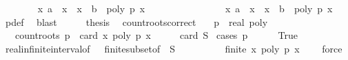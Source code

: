 \begin{isabellebody}
\ \ \ \ \ \ \isamarkupfalse%
\ {\isachardoublequoteopen}{\isacharbraceleft}x{\isachardot}\ a\ {\isacharless}\ x\ {\isasymand}\ x\ {\isasymle}\ b\ {\isasymand}\ poly\ p{\isacharprime}\ x\ {\isacharequal}\ {}{\isacharbraceright}\ {\isacharequal}\ \isanewline
\ \ \ \ \ \ \ \ \ \ \ \ {\isacharbraceleft}x{\isachardot}\ a\ {\isacharless}\ x\ {\isasymand}\ x\ {\isasymle}\ b\ {\isasymand}\ poly\ p\ x\ {\isacharequal}\ {}{\isacharbraceright}{\isachardoublequoteclose}\ \isamarkupfalse%
\ p{\isacharprime}{\isacharunderscore}def\ \isamarkupfalse%
\ blast\isanewline
\ \ \isamarkupfalse%
\ \isamarkupfalse%
\ {\isacharquery}thesis\ \isacommand{{\isachardot}}\isamarkupfalse%
\isanewline
{}\isamarkupfalse%
%
\endisatagproof
{\isafoldproof}%
%
\isadelimproof
\isanewline
%
\endisadelimproof
\isanewline
{}\isamarkupfalse%
\ count{\isacharunderscore}roots{\isacharunderscore}correct{\isacharcolon}\isanewline
\ \ \ p\ {\isacharcolon}{\isacharcolon}\ {\isachardoublequoteopen}real\ poly{\isachardoublequoteclose}\isanewline
\ \ \ {\isachardoublequoteopen}count{\isacharunderscore}roots\ p\ {\isacharequal}\ card\ {\isacharbraceleft}x{\isachardot}\ poly\ p\ x\ {\isacharequal}\ {}{\isacharbraceright}{\isachardoublequoteclose}\ {\isacharparenleft}\ {\isachardoublequoteopen}{\isacharunderscore}\ {\isacharequal}\ card\ {\isacharquery}S{\isachardoublequoteclose}{\isacharparenright}\isanewline
%
\isadelimproof
%
\endisadelimproof
%
\isatagproof
{}\isamarkupfalse%
\ {\isacharparenleft}cases\ {\isachardoublequoteopen}p\ {\isacharequal}\ {}{\isachardoublequoteclose}{\isacharparenright}\isanewline
\ \ \isamarkupfalse%
\ True\isanewline
\ \ \ \ \isamarkupfalse%
\ real{\isacharunderscore}infinite{\isacharunderscore}interval{\isacharbrackleft}of\ {}\ {}{\isacharbrackright}\ finite{\isacharunderscore}subset{\isacharbrackleft}of\ {\isachardoublequoteopen}{\isacharbraceleft}{}{\isacharless}{\isachardot}{\isachardot}{\isacharless}{}{\isacharbraceright}{\isachardoublequoteclose}\ {\isacharquery}S{\isacharbrackright}\isanewline
\ \ \ \ \ \ \ \ \isamarkupfalse%
\ {\isachardoublequoteopen}{\isasymnot}finite\ {\isacharbraceleft}x{\isachardot}\ poly\ p\ x\ {\isacharequal}\ {}{\isacharbraceright}{\isachardoublequoteclose}\ \isamarkupfalse%
\ force\isanewline

\end{isabellebody}
